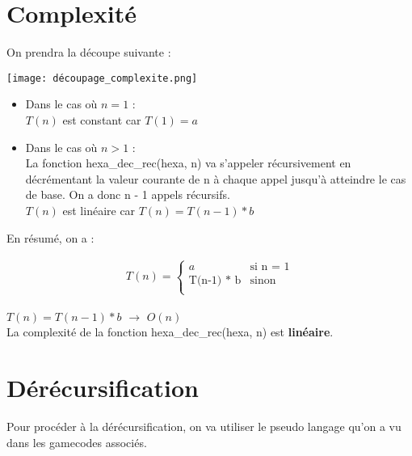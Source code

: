 \documentclass[a4paper, 11pt, oneside]{article}
\begin{document}
\section{Complexité}\label{complexite}
%
%

On prendra la découpe suivante :
\begin{center}
  \texttt{[image: découpage\_complexite.png]}
\end{center}

\begin{itemize}
    \item Dans le cas où $n = 1$ :\\
    
    $T(n)$ est constant car $T(1) = a$\\
    \item Dans le cas où $n > 1$ :\\

    La fonction hexa\_dec\_rec(hexa, n) va s'appeler récursivement en décrémentant la valeur courante de n à chaque appel jusqu'à atteindre le cas de base.
    On a donc n - 1 appels récursifs.\\
    
    $T(n)$ est linéaire car $T(n) = T(n-1) * b$\\
\end{itemize}

En résumé, on a :

\begin{eqnarray*}
  T(n)=
  \begin{cases}
    a &\text{si n = 1} \\
    \text{T(n-1) * b} &\text{sinon}\\
  \end{cases}
\end{eqnarray*}

$T(n) = T(n-1) * b$ $\rightarrow$ $O(n)$\\

La complexité de la fonction hexa\_dec\_rec(hexa, n) est \textbf{linéaire}.

\section{Dérécursification}\label{derecur}
%
%
Pour procéder à la dérécursification, on va utiliser le pseudo langage qu'on a vu dans les gamecodes associés.
\end{document}
